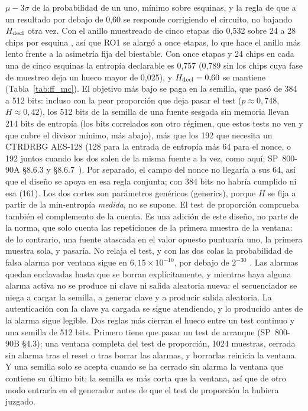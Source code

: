 $\mu - 3\sigma$ de la probabilidad de un uno, mínimo sobre esquinas, y
la regla de que a un resultado por debajo de 0,60 se responde
corrigiendo el circuito, no bajando $H_{\mathrm{decl}}$ otra vez. Con el anillo
muestreado de cinco etapas dio 0,532 sobre 24 a 28 chips por esquina
\simu{}, así que RO1 se alargó a once etapas, lo que hace el anillo más
lento frente a la asimetría fija del biestable. Con once etapas y 24
chips en cada una de cinco esquinas la entropía declarable es 0,757
\simu{} (0,789 sin los chips cuya fase de muestreo deja un hueco mayor
de 0,025), y $H_{\mathrm{decl}} = 0{,}60$ se mantiene (Tabla~\ref{tab:ff_mc}). El
objetivo más bajo se paga en la semilla, que pasó de 384 a 512 bits:
incluso con la peor proporción que deja pasar el test
($p \approx 0{,}748$, $H \approx 0{,}42$), los 512 bits de la semilla
de una fuente sesgada sin memoria llevan 214 bits de entropía (los bits
correlados son otro régimen, que estos tests no ven y que cubre el
divisor mínimo, más abajo), más que los 192 que necesita un \ac{CTRDRBG}
AES-128 (128 para la entrada de entropía más 64 para el nonce, o 192
juntos cuando los dos salen de la misma fuente a la vez, como aquí;
SP~800-90A \S8.6.3 y \S8.6.7~\cite{barker_2015_sp80090ar1}). Por
separado, el campo del nonce no llegaría a sus 64, así que el diseño se
apoya en esa regla conjunta; con 384 bits no habría cumplido ni esa (161).
Los dos
cortes son parámetros genéricos
(generics), porque $H$ se fija a partir de la min-entropía \emph{medida},
no se supone. El test de proporción comprueba también el
complemento de la cuenta. Es una adición de este diseño, no parte de la
norma, que solo cuenta las repeticiones de la primera muestra de la
ventana: de lo contrario, una fuente atascada en el valor opuesto
puntuaría uno, la primera muestra sola, y pasaría. No relaja el test, y
con las dos colas la probabilidad de falsa alarma por ventana sigue en
$6{,}15\times10^{-10}$, por debajo de $2^{-30}$ \est{}. Las alarmas
quedan enclavadas hasta que se borran explícitamente, y mientras haya
alguna alarma activa no se produce ni clave ni salida aleatoria nueva:
el secuenciador se niega a cargar la semilla, a generar clave y a
producir salida aleatoria. La autenticación con la clave ya cargada se
sigue atendiendo, y lo producido antes de la alarma sigue legible. Dos
reglas más cierran el hueco entre un test continuo y una semilla de 512
bits. Primero tiene que pasar un test de arranque (SP~800-90B \S4.3):
una ventana completa del test de proporción, 1024 muestras, cerrada sin
alarma tras el reset o tras borrar las alarmas, y borrarlas reinicia la
ventana. Y una semilla solo se acepta cuando se ha cerrado sin alarma la
ventana que contiene su último bit; la semilla es más corta que la
ventana, así que de otro modo entraría en el generador antes de que el
test de proporción la hubiera juzgado.

